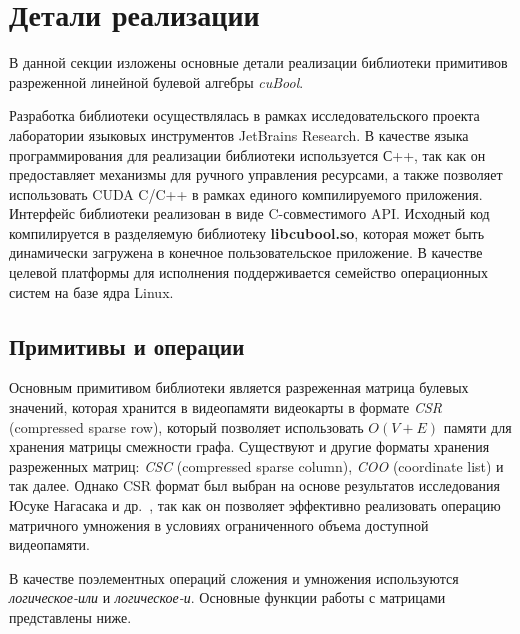 \section{Детали реализации}

В данной секции изложены основные детали реализации библиотеки примитивов разреженной линейной булевой алгебры \textit{cuBool}. 

Разработка библиотеки осуществлялась в рамках исследовательского проекта лаборатории языковых инструментов JetBrains Research. В качестве языка программирования для реализации библиотеки используется С++, 
так как он предоставляет механизмы для ручного управления ресурсами, 
а также позволяет использовать CUDA C/C++ в рамках единого компилируемого приложения. 
Интерфейс библиотеки реализован в виде C-совместимого API.
Исходный код компилируется в разделяемую библиотеку \textbf{libcubool.so}, 
которая может быть динамически загружена в конечное пользовательское приложение. 
В качестве целевой платформы для исполнения поддерживается семейство операционных систем на базе ядра Linux.

\subsection{Примитивы и операции}

Основным примитивом библиотеки является разреженная матрица булевых значений, 
которая хранится в видеопамяти видеокарты в формате \textit{CSR} (compressed sparse row), 
который позволяет использовать $O(V + E)$ памяти для хранения матрицы смежности графа. 
Существуют и другие форматы хранения разреженных матриц: \textit{CSC} (compressed sparse column), \textit{COO} (coordinate list) и так далее. 
Однако CSR формат был выбран на основе результатов исследования Юсуке Нагасака и др.~\cite{inproceedings:spgemm_mem_saving_for_nvidia}, 
так как он позволяет эффективно реализовать операцию матричного умножения в условиях ограниченного объема доступной видеопамяти. 

В качестве поэлементных операций сложения и умножения используются \textit{логическое-или} и \textit{логическое-и}. 
Основные функции работы с матрицами представлены ниже.


